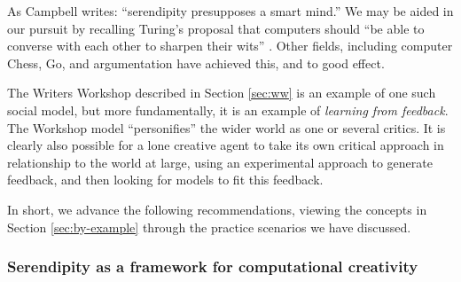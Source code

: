 As Campbell \citeyear{campbell} writes: ``serendipity
presupposes a smart mind.''  We may be aided in our pursuit by
recalling Turing's proposal that computers should ``be able to
converse with each other to sharpen their wits''
\cite{turing-intelligent}.  Other fields, including computer Chess,
Go, and argumentation have achieved this, and to good effect.

The Writers Workshop described in Section \ref{sec:ww} is an example
of one such social model, but more fundamentally, it is an example of
\emph{learning from feedback}.  The Workshop model ``personifies'' the
wider world as one or several critics.  It is clearly also possible
for a lone creative agent to take its own critical approach in relationship
to the world at large, using an experimental approach to generate
feedback, and then looking for models to fit this feedback.


In short, we advance the following recommendations, viewing the
concepts in Section \ref{sec:by-example} through the practice
scenarios we have discussed.

\subsubsection*{Serendipity as a framework for computational creativity}

